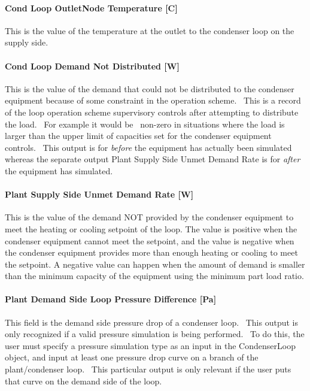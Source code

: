 \paragraph{Cond Loop OutletNode Temperature {[}C{]}}\label{cond-loop-outletnode-temperature-c}

This is the value of the temperature at the outlet to the condenser loop on the supply side.

\paragraph{Cond Loop Demand Not Distributed {[}W{]}}\label{cond-loop-demand-not-distributed-w}

This is the value of the demand that could not be distributed to the condenser equipment because of some constraint in the operation scheme.~ This is a record of the loop operation scheme supervisory controls after attempting to distribute the load.~ For example it would be~ non-zero in situations where the load is larger than the upper limit of capacities set for the condenser equipment controls.~ This output is for \emph{before} the equipment has actually been simulated whereas the separate output Plant Supply Side Unmet Demand Rate is for \emph{after} the equipment has simulated.

\paragraph{Plant Supply Side Unmet Demand Rate {[}W{]}}\label{plant-supply-side-unmet-demand-rate-w-1}

This is the value of the demand NOT provided by the condenser equipment to meet the heating or cooling setpoint of the loop. The value is positive when the condenser equipment cannot meet the setpoint, and the value is negative when the condenser equipment provides more than enough heating or cooling to meet the setpoint. A negative value can happen when the amount of demand is smaller than the minimum capacity of the equipment using the minimum part load ratio.

\paragraph{Plant Demand Side Loop Pressure Difference {[}Pa{]}}\label{plant-demand-side-loop-pressure-difference-pa-1}

This field is the demand side pressure drop of a condenser loop.~ This output is only recognized if a valid pressure simulation is being performed.~ To do this, the user must specify a pressure simulation type as an input in the CondenserLoop object, and input at least one pressure drop curve on a branch of the plant/condenser loop.~ This particular output is only relevant if the user puts that curve on the demand side of the loop.

